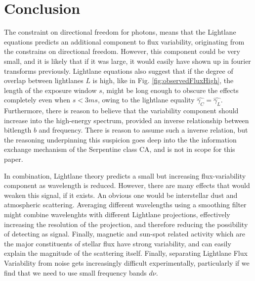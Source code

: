 \documentclass[notitlepage]{article}
\begin{document}
\section{Conclusion}

The constraint on directional freedom for photons, means that the Lightlane equations predicts an additional component to flux variability, originating from the constrains on directional freedom. However, this component could be very small, and it is likely that if it was large, it would easily have shown up in fourier transforms previously. Lightlane equations also suggest that if the degree of overlap between lightlanes $L$ is high, like in Fig. \ref{fig:observedFluxHigh}, the length of the exposure window $s$, might be long enough to obscure the effects completely even when $s < 3ms$, owing to the lightlane equality $\hat{\gamma_C} = \hat{\gamma_L}$. Furthermore, there is reason to believe that the variability component should increase into the high-energy spectrum, provided an inverse relationship between bitlength $b$ and frequency. There is reason to assume such a inverse relation, but the reasoning  underpinning this suspicion goes deep into the the information exchange mechanism of the Serpentine class CA, and is not in scope for this paper.

In combination, Lightlane theory predicts a small but increasing flux-variability component as wavelength is reduced. However, there are many effects that would weaken this signal, if it exists. An obvious one would be interstellar dust and atmospheric scattering. Averaging different wavelengths using a smoothing filter might combine wavelenghts with different Lightlane projections, effectively increasing the resolution of the projection, and therefore reducing the possibility of detecting as signal. Finally, magnetic and sun-spot related activity which are the major constituents of stellar flux have strong variability, and can easily explain the magnitude of the scattering itself. Finally, separating Lightlane Flux Variability from noise gets increasingly difficult experimentally, particularly if we find that we need to use small frequency bands $d\nu$. 
\end{document}
